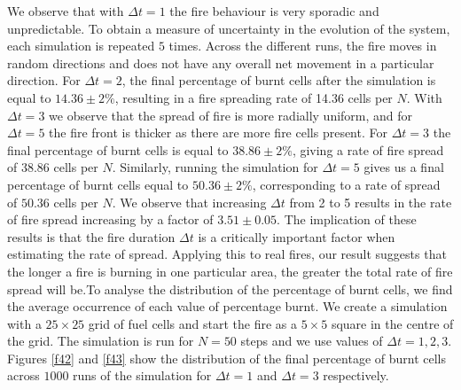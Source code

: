 \noindent We observe that with $\Delta t=1$ the fire behaviour is very sporadic and unpredictable. To obtain a measure of uncertainty in the evolution of the system, each simulation is repeated $5$ times. Across the different runs, the fire moves in random directions and does not have any overall net movement in a particular direction. \newline \indent For $\Delta t=2$, the final percentage of burnt cells after the simulation is equal to $14.36\pm2\%$, resulting in a fire spreading rate of 14.36 cells per $N$. With $\Delta t=3$ we observe that the spread of fire is more radially uniform, and for $\Delta t=5$ the fire front is thicker as there are more fire cells present. For $\Delta t=3$ the final percentage of burnt cells is equal to $38.86\pm2\%$, giving a rate of fire spread of 38.86 cells per $N$. Similarly, running the simulation for $\Delta t=5$ gives us a final percentage of burnt cells equal to $50.36\pm2\%$, corresponding to a rate of spread of $50.36$ cells per $N$. We observe that increasing $\Delta t$ from 2 to 5 results in the rate of fire spread increasing by a factor of $3.51\pm0.05$. \newline \indent The implication of these results is that the fire duration $\Delta t$ is a critically important factor when estimating the rate of spread. Applying this to real fires, our result suggests that the longer a fire is burning in one particular area, the greater the total rate of fire spread will be.\newline \indent To analyse the distribution of the percentage of burnt cells, we find the average occurrence of each value of percentage burnt. We create a simulation with a $25\times25$ grid of fuel cells and start the fire as a $5\times5$ square in the centre of the grid. The simulation is run for $N=50$ steps and we use values of $\Delta t=1,2,3$. Figures \ref{f42} and \ref{f43} show the distribution of the final percentage of burnt cells across $1000$ runs of the simulation for $\Delta t=1$ and $\Delta t=3$ respectively.

